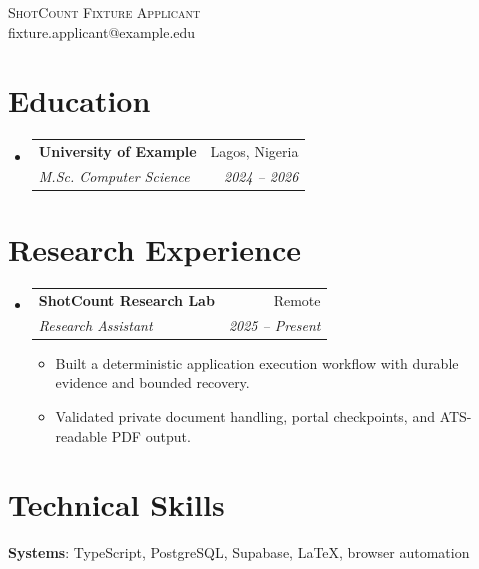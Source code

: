 \documentclass[letterpaper,11pt]{article}
\makeatletter
\newcommand{\resumeItem}[1]{
  \item\small{
    {#1 \vspace{-2pt}}
  }
}
\newcommand{\resumeSubheading}[4]{
  \vspace{-2pt}\item
    \begin{tabular*}{0.97\textwidth}[t]{l@{\extracolsep{\fill}}r}
      \textbf{#1} & #2 \\
      \textit{\small#3} & \textit{\small #4} \\
    \end{tabular*}\vspace{-7pt}
}
\newcommand{\resumeSubHeadingListStart}{\begin{itemize}[leftmargin=0.15in, label={}]}
\newcommand{\resumeSubHeadingListEnd}{\end{itemize}}
\newcommand{\resumeItemListStart}{\begin{itemize}}
\newcommand{\resumeItemListEnd}{\end{itemize}\vspace{-5pt}}
\makeatother
\begin{document}


\begin{center}
  {\Huge \scshape ShotCount Fixture Applicant} \\ \vspace{1pt}
  \small fixture.applicant@example.edu
\end{center}

\section{Education}
\resumeSubHeadingListStart
  \resumeSubheading
    {University of Example}{Lagos, Nigeria}
    {M.Sc. Computer Science}{2024 -- 2026}
\resumeSubHeadingListEnd

\section{Research Experience}
\resumeSubHeadingListStart
  \resumeSubheading
    {ShotCount Research Lab}{Remote}
    {Research Assistant}{2025 -- Present}
  \resumeItemListStart
    \resumeItem{Built a deterministic application execution workflow with durable evidence and bounded recovery.}
    \resumeItem{Validated private document handling, portal checkpoints, and ATS-readable PDF output.}
  \resumeItemListEnd
\resumeSubHeadingListEnd

\section{Technical Skills}
\begin{itemize}[leftmargin=0.15in, label={}]
  \small{\item{
    \textbf{Systems}{: TypeScript, PostgreSQL, Supabase, LaTeX, browser automation} \\
  }}
\end{itemize}
\end{document}

